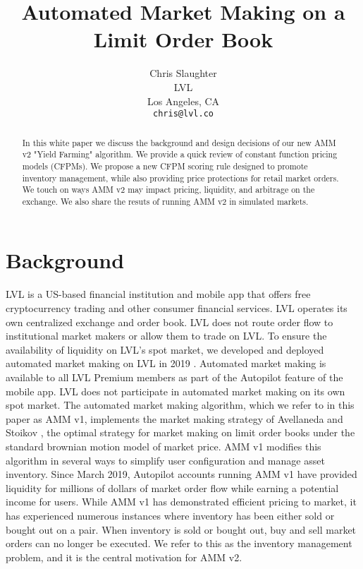 \documentclass{article}
\title{Automated Market Making on a Limit Order Book}
\author{
  Chris Slaughter \\
  LVL\\
  Los Angeles, CA\\
  \texttt{chris@lvl.co}
}
\begin{document}
\maketitle

\begin{abstract}

In this white paper we discuss the background and design decisions of our new AMM v2 "Yield Farming" algorithm. We provide a quick review of constant function pricing models (CFPMs). We propose a new CFPM scoring rule designed to promote inventory management, while also providing price protections for retail market orders. We touch on ways AMM v2 may impact pricing, liquidity, and arbitrage on the exchange. We also share the resuts of running AMM v2 in simulated markets.

\end{abstract}


\section{Background}
\label{sec:background}

LVL is a US-based financial institution and mobile app that offers free cryptocurrency trading and other consumer financial services. LVL operates its own centralized exchange and order book. LVL does not route order flow to institutional market makers or allow them to trade on LVL. To ensure the availability of liquidity on LVL's spot market, we developed and deployed automated market making on LVL in 2019 \cite{amm2019}. Automated market making is available to all LVL Premium members as part of the Autopilot feature of the mobile app. LVL does not participate in automated market making on its own spot market. The automated market making algorithm, which we refer to in this paper as AMM v1, implements the market making strategy of Avellaneda and Stoikov \cite{avellaneda}, the optimal strategy for market making on limit order books under the standard brownian motion model of market price. AMM v1 modifies this algorithm in several ways to simplify user configuration and manage asset inventory. Since March 2019, Autopilot accounts running AMM v1 have provided liquidity for millions of dollars of market order flow while earning a potential income for users. While AMM v1 has demonstrated efficient pricing to market, it has experienced numerous instances where inventory has been either sold or bought out on a pair. When inventory is sold or bought out, buy and sell market orders can no longer be executed. We refer to this as the inventory management problem, and it is the central motivation for AMM v2.
\end{document}
